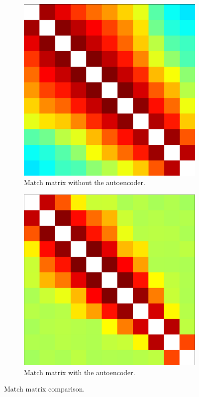 \begin{figure}[H]
     \centering
          \begin{subfigure}[b]{0.40\textwidth}
		\centering
    		\includegraphics[width=\textwidth]{images/matrix.png}
		\caption{\centering Match matrix without the autoencoder.}
		\label{fig:matrix1}   
     \end{subfigure}
     \hfill
     \begin{subfigure}[b]{.40\textwidth}
		\centering
		\includegraphics[width=\textwidth]{images/matrixautoenc.png}  
		\caption{\centering Match matrix with the autoencoder.}
	    	\label{fig:matrixautoenc} 
     \end{subfigure}
        \caption{Match matrix comparison.}
        \label{fig:matrix}
\end{figure}

